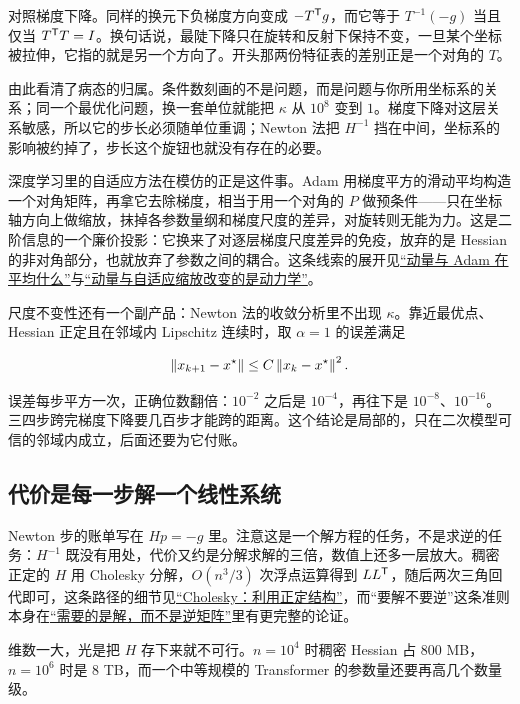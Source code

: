 对照梯度下降。同样的换元下负梯度方向变成 \(-T^{\mathsf{T}}g\)，而它等于 \(T^{-1}(-g)\) 当且仅当 \(T^{\mathsf{T}}T=I\)。换句话说，最陡下降只在旋转和反射下保持不变，一旦某个坐标被拉伸，它指的就是另一个方向了。开头那两份特征表的差别正是一个对角的 \(T\)。

由此看清了病态的归属。条件数刻画的不是问题，而是问题与你所用坐标系的关系；同一个最优化问题，换一套单位就能把 \(\kappa\) 从 \(10^8\) 变到 \(1\)。梯度下降对这层关系敏感，所以它的步长必须随单位重调；Newton 法把 \(H^{-1}\) 挡在中间，坐标系的影响被约掉了，步长这个旋钮也就没有存在的必要。

深度学习里的自适应方法在模仿的正是这件事。Adam 用梯度平方的滑动平均构造一个对角矩阵，再拿它去除梯度，相当于用一个对角的 \(P\) 做预条件——只在坐标轴方向上做缩放，抹掉各参数量纲和梯度尺度的差异，对旋转则无能为力。这是二阶信息的一个廉价投影：它换来了对逐层梯度尺度差异的免疫，放弃的是 Hessian 的非对角部分，也就放弃了参数之间的耦合。这条线索的展开见\hyperref[sec:14-Deep-Learning/03-Optimization-and-Training/02]{``动量与 Adam 在平均什么''}与\hyperref[sec:09-Convex-Optimization/08-Nonconvex-and-Stochastic-Optimization/05]{``动量与自适应缩放改变的是动力学''}。

尺度不变性还有一个副产品：Newton 法的收敛分析里不出现 \(\kappa\)。靠近最优点、Hessian 正定且在邻域内 Lipschitz 连续时，取 \(\alpha=1\) 的误差满足

\[
\left\lVert x_{k+1}-x^\star\right\rVert\le C\left\lVert x_k-x^\star\right\rVert^2 .
\]

误差每步平方一次，正确位数翻倍：\(10^{-2}\) 之后是 \(10^{-4}\)，再往下是 \(10^{-8}\)、\(10^{-16}\)。三四步跨完梯度下降要几百步才能跨的距离。这个结论是局部的，只在二次模型可信的邻域内成立，后面还要为它付账。

\subsection{代价是每一步解一个线性系统}

Newton 步的账单写在 \(Hp=-g\) 里。注意这是一个解方程的任务，不是求逆的任务：\(H^{-1}\) 既没有用处，代价又约是分解求解的三倍，数值上还多一层放大。稠密正定的 \(H\) 用 Cholesky 分解，\(O(n^3/3)\) 次浮点运算得到 \(LL^{\mathsf{T}}\)，随后两次三角回代即可，这条路径的细节见\hyperref[sec:08-Numerical-Analysis/05-Numerical-Linear-Algebra/03]{``Cholesky：利用正定结构''}，而``要解不要逆''这条准则本身在\hyperref[sec:08-Numerical-Analysis/07-Numerical-Methods-for-ML/03]{``需要的是解，而不是逆矩阵''}里有更完整的论证。

维数一大，光是把 \(H\) 存下来就不可行。\(n=10^4\) 时稠密 Hessian 占 \(800\) MB，\(n=10^6\) 时是 \(8\) TB，而一个中等规模的 Transformer 的参数量还要再高几个数量级。

